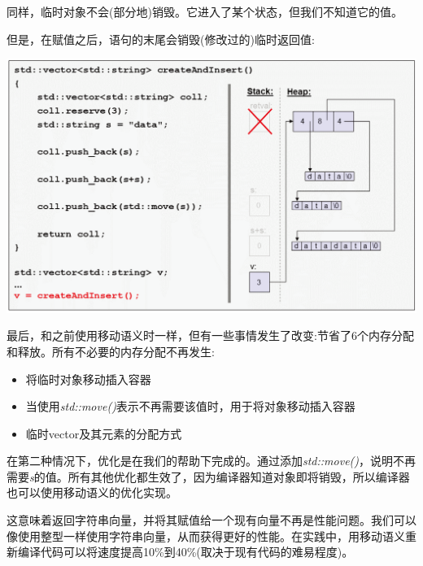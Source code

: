 \begin{itemize}
\begin{center}
	\end{center}
	同样，临时对象不会(部分地)销毁。它进入了某个状态，但我们不知道它的值。\par
	但是，在赋值之后，语句的末尾会销毁(修改过的)临时返回值:\par
	\begin{center}
		\includegraphics[width=1.0\textwidth]{content/1/chapter1/images/17}
	\end{center}
\end{itemize}

最后，和之前使用移动语义时一样，但有一些事情发生了改变:节省了6个内存分配和释放。所有不必要的内存分配不再发生:\par

\begin{itemize}
	\item 将临时对象移动插入容器
	\item 当使用\textit{std::move()}表示不再需要该值时，用于将对象移动插入容器
	\item 临时vector及其元素的分配方式
\end{itemize}

在第二种情况下，优化是在我们的帮助下完成的。通过添加\textit{std::move()}，说明不再需要\textit{s}的值。所有其他优化都生效了，因为编译器知道对象即将销毁，所以编译器也可以使用移动语义的优化实现。\par

这意味着返回字符串向量，并将其赋值给一个现有向量不再是性能问题。我们可以像使用整型一样使用字符串向量，从而获得更好的性能。在实践中，用移动语义重新编译代码可以将速度提高10\%到40\%(取决于现有代码的难易程度)。\par


























